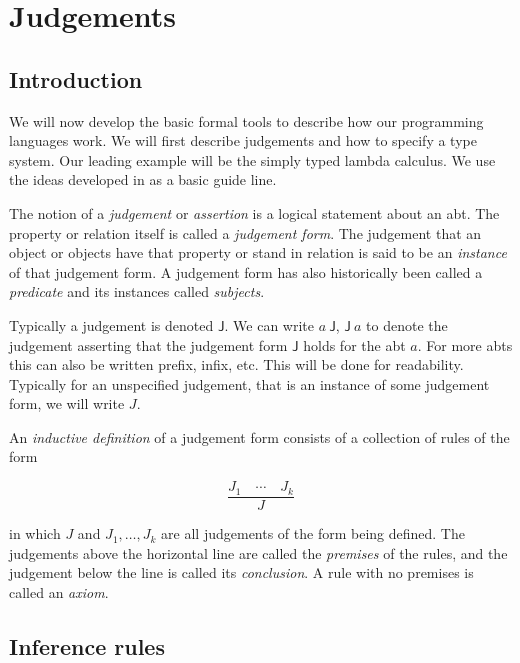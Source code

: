 \section{Judgements}

\subsection{Introduction}

We will now develop the basic formal tools to describe how our programming languages work.  We will first describe judgements and how to specify a type system. Our leading example will be the simply typed lambda calculus. We use the ideas developed in \cite{harper_2016} as a basic guide line. 

\begin{defin}
    The notion of a \emph{judgement} or \emph{assertion} is a logical statement about an abt. The property or relation itself is called a \emph{judgement form}. The judgement that an object or objects have that property or stand in relation is said to be an \emph{instance} of that judgement form. A judgement form has also historically been called a \emph{predicate} and its instances called \emph{subjects}.
\end{defin}

\begin{remark}
    Typically a judgement is denoted $\mathsf{J}$. We can write $a\ \mathsf{J}$, $\mathsf{J}\ a$ to denote the judgement asserting that the judgement form $\mathsf{J}$ holds for the abt $a$. For more abts this can also be written prefix, infix, etc. This will be done for readability. Typically for an unspecified judgement, that is an instance of some judgement form, we will write $J$.
\end{remark}

\begin{defin}
    An \emph{inductive definition} of a judgement form consists of a collection of rules of the form
    
    $$\frac
        {J_1 \quad \cdots \quad J_k}
        {J}
    $$
    
    in which $J$ and $J_1, \dots , J_k$ are all judgements of the form being defined. The judgements above the horizontal line are called the \emph{premises} of the rules, and the judgement below the line is called its \emph{conclusion}. A rule with no premises is called an \emph{axiom}.
\end{defin}

\subsection{Inference rules}

